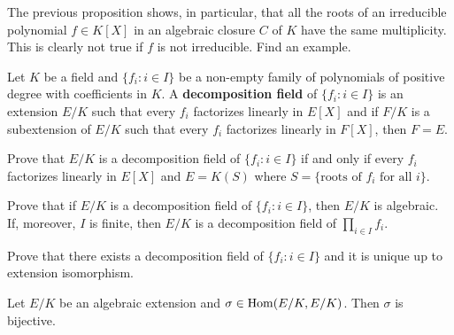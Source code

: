 The previous proposition shows, in particular, 
that all the roots of 
an irreducible polynomial $f\in K[X]$ 
in an algebraic closure $C$ of $K$
have the same multiplicity. This is clearly 
not true if $f$ is not irreducible. Find an example.



\begin{definition}
    Let $K$ be a field and $\{f_i:i\in I\}$ be a non-empty 
    family of polynomials of positive degree
    with coefficients in $K$. A \textbf{decomposition field} 
    of $\{f_i:i\in I\}$ is an extension $E/K$
    such that every $f_i$ factorizes linearly in $E[X]$ and 
    if $F/K$ is a subextension of $E/K$ such that every $f_i$ 
    factorizes linearly in $F[X]$, then $F=E$. 
\end{definition}

\begin{exercise}
    Prove that $E/K$ is a decomposition field of
    $\{f_i:i\in I\}$ if and only if every $f_i$ factorizes linearly 
    in $E[X]$ and $E=K(S)$ where $S=\{\text{roots of $f_i$ for all $i$}\}$. 
\end{exercise}

\begin{exercise}
    Prove that if $E/K$ is a decomposition field
    of $\{f_i:i\in I\}$, then $E/K$ is algebraic. If, moreover, 
    $I$ is finite, then $E/K$ is a decomposition field
    of $\prod_{i\in I}f_i$. 
\end{exercise}

\begin{exercise}
    Prove that 
    there exists a decomposition field of $\{f_i:i\in I\}$ 
    and it is unique up to extension isomorphism. 
\end{exercise}


\begin{proposition}
    Let $E/K$ be an algebraic extension and $\sigma\in\operatorname{Hom}(E/K,E/K)$. 
    Then $\sigma$ is bijective. 
\end{proposition}

